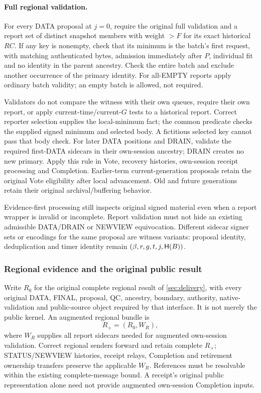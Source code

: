 \paragraph{Full regional validation.}
For every DATA proposal at $j=0$, require the original full validation
and a report set of distinct snapshot members with weight $>F$ for its
exact historical $\mathit{RC}$. If any key is nonempty, check that its
minimum is the batch's first request, with matching authenticated bytes,
admission immediately after $P$, individual fit and no identity in the
parent ancestry. Check the entire batch and exclude another occurrence
of the primary identity. For all-EMPTY reports apply ordinary batch
validity; an empty batch is allowed, not required.

Validators do not compare the witness with their own queues, require
their own report, or apply current-time/current-$G$ tests to a historical
report. Correct reporter selection supplies the local-minimum fact;
the common predicate checks the supplied signed minimum and selected
body. A fictitious selected key cannot pass that body check.
For later DATA positions and DRAIN, validate the required first-DATA
sidecars in their own-session ancestry; DRAIN creates no new primary.
Apply this rule in Vote, recovery histories, own-session receipt
processing and Completion. Earlier-term current-generation proposals
retain the original Vote eligibility after local advancement. Old and
future generations retain their original archival/buffering behavior.

Evidence-first processing still inspects original signed material even
when a report wrapper is invalid or incomplete. Report validation must
not hide an existing admissible DATA/DRAIN or NEWVIEW equivocation.
Different sidecar signer sets or encodings for the same proposal are
witness variants: proposal identity, deduplication and timer identity
remain $(\beta,r,g,t,j,\mathsf H(B))$.

\subsubsection{Regional evidence and the original public result}
\label{sec:input-report-carriage}
Write $R_0$ for the original complete regional result of
\cref{sec:delivery}, with every original DATA, FINAL, proposal, QC,
ancestry, boundary, authority, native-validation and public-source object
required by that interface. It is not merely the public kernel.
An augmented regional bundle is
\[
 R_+=(R_0,W_R),
\]
where $W_R$ supplies all report sidecars needed for augmented own-session
validation. Correct regional senders forward and retain complete $R_+$;
STATUS/NEWVIEW histories, receipt relays, Completion and retirement
ownership transfers preserve the applicable $W_R$. References must be
resolvable within the existing complete-message bound. A receipt's
original public representation alone need not provide augmented
own-session Completion inputs.

